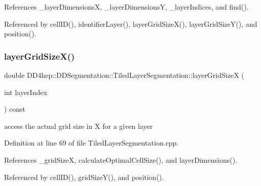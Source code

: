 References \+\_\+layer\+DimensionsX, \+\_\+layer\+DimensionsY, \+\_\+layer\+Indices, and find().



Referenced by cell\+I\+D(), identifier\+Layer(), layer\+Grid\+Size\+X(), layer\+Grid\+Size\+Y(), and position().

\hypertarget{class_d_d4hep_1_1_d_d_segmentation_1_1_tiled_layer_segmentation_ad41cd4eaa02089ec707a7893d8f0845d}{}\label{class_d_d4hep_1_1_d_d_segmentation_1_1_tiled_layer_segmentation_ad41cd4eaa02089ec707a7893d8f0845d} 
\subsubsection{\texorpdfstring{layer\+Grid\+Size\+X()}{layerGridSizeX()}}
{\footnotesize\ttfamily double D\+D4hep\+::\+D\+D\+Segmentation\+::\+Tiled\+Layer\+Segmentation\+::layer\+Grid\+SizeX (\begin{DoxyParamCaption}\item[{int}]{layer\+Index }\end{DoxyParamCaption}) const}



access the actual grid size in X for a given layer 



Definition at line 69 of file Tiled\+Layer\+Segmentation.\+cpp.



References \+\_\+grid\+SizeX, calculate\+Optimal\+Cell\+Size(), and layer\+Dimensions().



Referenced by cell\+I\+D(), grid\+Size\+Y(), and position().

\hypertarget{class_d_d4hep_1_1_d_d_segmentation_1_1_tiled_layer_segmentation_a70bc0631f65102abda8962823ae90e1a}{}\label{class_d_d4hep_1_1_d_d_segmentation_1_1_tiled_layer_segmentation_a70bc0631f65102abda8962823ae90e1a} 

